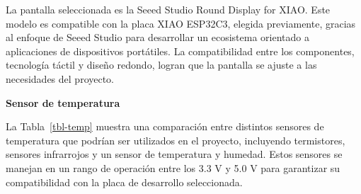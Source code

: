 \documentclass[
  12pt,
  letterpaper,
  DIV=11,
  numbers=noendperiod]{scrreport}
\begin{document}
La pantalla seleccionada es la Seeed Studio Round Display for XIAO. Este
modelo es compatible con la placa XIAO ESP32C3, elegida previamente,
gracias al enfoque de Seeed Studio para desarrollar un ecosistema
orientado a aplicaciones de dispositivos portátiles. La compatibilidad
entre los componentes, tecnología táctil y diseño redondo, logran que la
pantalla se ajuste a las necesidades del proyecto.

\textbf{Sensor de temperatura}

La Tabla~\ref{tbl-temp} muestra una comparación entre distintos sensores
de temperatura que podrían ser utilizados en el proyecto, incluyendo
termistores, sensores infrarrojos y un sensor de temperatura y humedad.
Estos sensores se manejan en un rango de operación entre los 3.3 V y 5.0
V para garantizar su compatibilidad con la placa de desarrollo
seleccionada.
\end{document}
